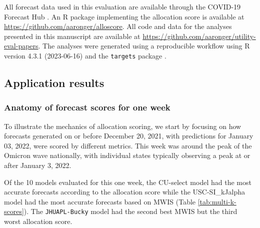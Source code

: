 \documentclass{article}\usepackage[]{graphicx}\usepackage[]{xcolor}
\begin{document}
All forecast data used in this evaluation are available through the COVID-19 Forecast Hub \citep{cramer_united_2022}. An
R package implementing the allocation score is available at \url{https://github.com/aaronger/alloscore}. All code and
data for the analyses presented in this manuscript are available at
\url{https://github.com/aaronger/utility-eval-papers}. The analyses were generated using a reproducible workflow using
R version 4.3.1 (2023-06-16) and the {\tt targets} package \citep{Rcore-2023, landau_2021_targets}.

\subsection{Application results}







\subsubsection{Anatomy of forecast scores for one week}

To illustrate the mechanics of allocation scoring, we start by focusing on how forecasts generated on or before December
20, 2021, with predictions for January 03, 2022, were scored by different metrics. This week was around the peak of the
Omicron wave nationally, with individual states typically observing a peak at or after January 3, 2022.

Of the 10 models evaluated for this one week, the CU-select model had the most accurate forecasts according to the
allocation score while the USC-SI\_kJalpha model had the most accurate forecasts based on MWIS (Table
\ref{tab:multi-k-scores}). The \texttt{JHUAPL-Bucky} model had the second best MWIS but the third worst allocation score.
\end{document}
